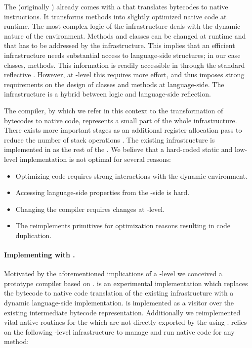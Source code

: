 \noindent The \PH \VM (originally ) already comes with a \JIT that translates bytecodes to native instructions.
It transforms \PH methods into slightly optimized native code at runtime.
The most complex logic of the \JIT infrastructure deals with the dynamic nature of the \PH environment.
Methods and classes can be changed at runtime and that has to be addressed by the \JIT infrastructure.
This implies that an efficient \JIT infrastructure needs substantial access to language-side structures; in our case classes, methods.
This information is readily accessible in \PH through the standard reflective \API.
However, at \VM-level this requires more effort, and thus imposes strong requirements on the design of classes and methods at language-side.
The \JIT infrastructure is a hybrid between \VM logic and language-side reflection.

The \JIT compiler, by which we refer in this context to the transformation of bytecodes to native code, represents a small part of the whole \JIT infrastructure.
There exists more important stages as an additional register allocation pass to reduce the number of stack operations \cite{Mira99a,Mira11a}.
The existing \JIT infrastructure is implemented in \Slang \cite[Ch.\ 5]{Blac09a} as the rest of the \VM.
We believe that a hard-coded static and low-level implementation is not optimal for several reasons:

\begin{itemize}
	\item Optimizing \PH code requires strong interactions with the dynamic environment.
	\item Accessing language-side properties from the \VM-side is hard.
	\item Changing the \JIT compiler requires changes at \VM-level.
	\item The \JIT reimplements primitives for optimization reasons resulting in code duplication.
\end{itemize}

\paragraph{Implementing \NBJ with \B.}
Motivated by the aforementioned implications of a \VM-level \JIT we conceived \NB a prototype \JIT compiler based on \B.
\NBJ is an experimental \JIT implementation which replaces the bytecode to native code translation of the existing \JIT infrastructure with a dynamic language-side implementation.
\NBJ is implemented as a visitor over the existing intermediate bytecode representation. 
Additionally we reimplemented vital native routines for the \JIT which are not directly exported by the \VM using \B. 
\NBJ relies on the following \VM-level infrastructure to manage and run native code for any \PH method:

